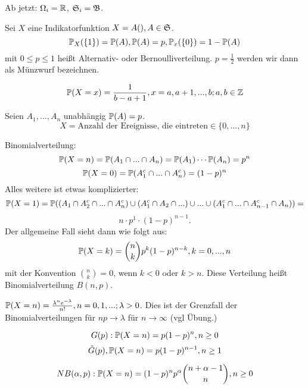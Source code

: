 			\begin{bem}
				Ab jetzt: $\Omega_i=\R$, $\mf{S}_i=\mf{B}$. 
			\end{bem}
			
			\begin{defi}
				Sei $X$ eine Indikatorfunktion $X=A(), A\in\mf{S}$. 
				\[ \P_X(\{1\})=\P(A), \P(A)=p,\P_x(\{0\})=1-\P(A) \]
				mit $0\le p\le 1$ heißt Alternativ- oder Bernoulliverteilung. $p=\frac{1}{2}$ werden wir dann als Münzwurf bezeichnen. 
			\end{defi}
			
			\begin{defi}
				
				\[ \P(X=x)=\frac{1}{b-a+1}, x=a,a+1,...,b; a,b\in\Z \]
			\end{defi}
			
			\begin{defi}[Binomialverteilung]
				Seien $A_1,...,A_n$ unabhängig $\P(A)=p$. 
				\[ X=\text{Anzahl der Ereignisse, die eintreten}\in\{0,...,n\} \]
			\end{defi}
			
			\begin{bsp}
				Binomialverteilung: 
				\[ \P(X=n)=\P(A_1\cap ...\cap A_n)=\P(A_1)\cdots\P(A_n)=p^n \]
				\[ \P(X=0)=\P(A_1^c\cap...\cap A_n^c)=(1-p)^n \]
				Alles weitere ist etwas komplizierter:
				\[ \P(X=1)=\P((A_1\cap A_2^c\cap...\cap A_n^c)\cup(A_1^c\cap A_2\cap ...)\cup...\cup(A_1^c\cap...\cap A_{n-1}^c\cap A_n))= \]
				\[ n\cdot p^1\cdot (1-p)^{n-1}. \]
				Der allgemeine Fall sieht dann wie folgt aus:
				\[ \P(X=k)=\binom{n}{k}p^k (1-p)^{n-k}, k=0,...,n \]
				mit der Konvention $\binom{n}{k}=0$, wenn $k<0$ oder $k>n$. Diese Verteilung heißt Binomialverteilung $B(n,p)$. 
			\end{bsp}
			
			\begin{defi}
				$\P(X=n)=\frac{\lambda^ne^{-\lambda}}{n!}, n=0,1,...; \lambda>0$. Dies ist der Grenzfall der Binomialverteilungen für $np\to \lambda$ für $n\to\infty$ (vgl Übung.)
			\end{defi}
			
			\begin{defi}
				\[G(p): \P(X=n)=p(1-p)^n, n\ge 0\] 
				\[\tilde{G}(p), \P(X=n)=p(1-p)^{n-1}, n\ge 1\]
			\end{defi}
			
			\begin{defi}
				\[ NB(\alpha,p): \P(X=n)=(1-p)^np^\alpha\binom{n+\alpha-1}{n}, n\ge 0 \]
				
			\end{defi}

